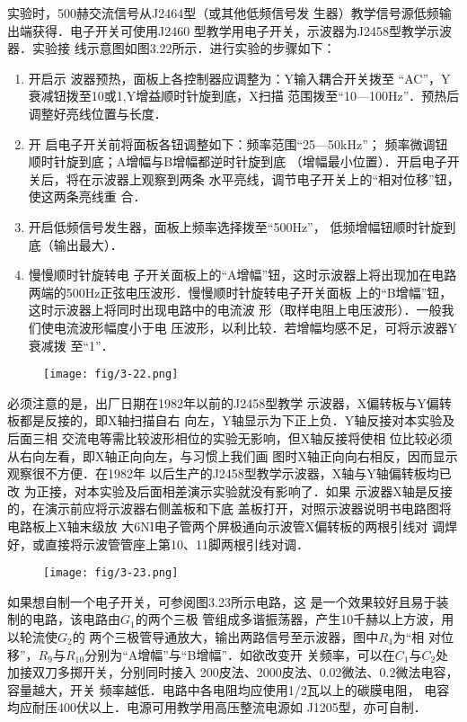 实验时，500赫交流信号从J2464型（或其他低频信号发
生器）教学信号源低频输出端获得．电子开关可使用J2460
型教学用电子开关，示波器为J2458型教学示波器．实验接
线示意图如图3.22所示．进行实验的步骤如下：
\begin{enumerate}
    \item 开启示
波器预热，面板上各控制器应调整为：Y输入耦合开关拨至
“AC”，Y衰减钮拨至10或1,Y增益顺时针旋到底，X扫描
范围拨至“10—100Hz”．预热后调整好亮线位置与长度．
\item 开
启电子开关前将面板各钮调整如下：频率范围“25—50kHz”；
频率微调钮顺时针旋到底；A增幅与B增幅都逆时针旋到底
（增幅最小位置）．开启电子开关后，将在示波器上观察到两条
水平亮线，调节电子开关上的“相对位移”钮，使这两条亮线重
合．
\item 开启低频信号发生器，面板上频率选择拨至“500Hz”，
低频增幅钮顺时针旋到底（输出最大）．
\item 慢慢顺时针旋转电
子开关面板上的“A增幅”钮，这时示波器上将出现加在电路
两端的500Hz正弦电压波形．慢慢顺时针旋转电子开关面板
上的“B增幅”钮，这时示波器上将同时出现电路中的电流波
形（取样电阻上电压波形）．一般我们使电流波形幅度小于电
压波形，以利比较．若增幅均感不足，可将示波器Y衰减拨
至“1”．
\end{enumerate}

\begin{figure}[htp]
    \centering
\texttt{[image: fig/3-22.png]}
    \caption{}
\end{figure}

必须注意的是，出厂日期在1982年以前的J2458型教学
示波器，X偏转板与Y偏转板都是反接的，即X轴扫描自右
向左，Y轴显示为下正上负．Y轴反接对本实验及后面三相
交流电等需比较波形相位的实验无影响，但X轴反接将使相
位比较必须从右向左看，即X轴正向向左，与习惯上我们画
图时X轴正向向右相反，因而显示观察很不方便．在1982年
以后生产的J2458型教学示波器，X轴与Y轴偏转板均已改
为正接，对本实验及后面相差演示实验就没有影响了．如果
示波器X轴是反接的，在演示前应将示波器右侧盖板和下底
盖板打开，对照示波器说明书电路图将电路板上X轴末级放
大6NI电子管两个屏极通向示波管X偏转板的两根引线对
调焊好，或直接将示波管管座上第10、11脚两根引线对调．

\begin{figure}[htp]
    \centering
\texttt{[image: fig/3-23.png]}
    \caption{}
\end{figure}

如果想自制一个电子开关，可参阅图3.23所示电路，这
是一个效果较好且易于装制的电路，该电路由$G_1$的两个三极
管组成多谐振荡器，产生10千赫以上方波，用以轮流使$G_2$的
两个三极管导通放大，输出两路信号至示波器，图中$R_4$为“相
对位移”，$R_9$与$R_{10}$分别为“A增幅”与“B增幅”．如欲改变开
关频率，可以在$C_1$与$C_2$处加接双刀多掷开关，分别同时接入
200皮法、2000皮法、0.02微法、0.2微法电容，容量越大，开关
频率越低．电路中各电阻均应使用1/2瓦以上的碳膜电阻，
电容均应耐压400伏以上．电源可用教学用高压整流电源如
J1205型，亦可自制．

